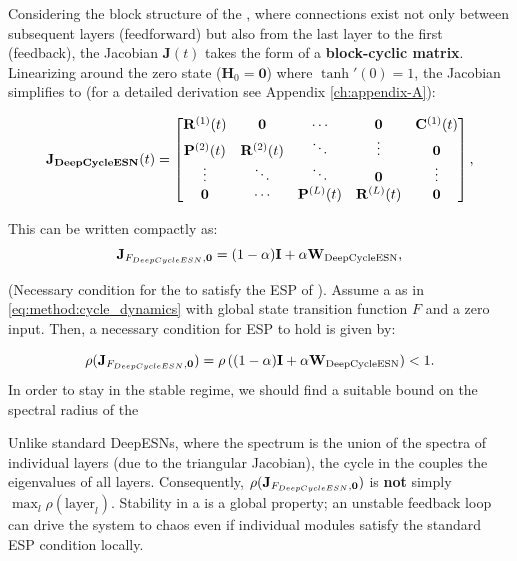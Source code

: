 Considering the block structure of the \DCR, where connections exist not only between subsequent layers
 (feedforward) but also from the last layer to the first (feedback), the Jacobian $\mathbf{J}(t)$ 
 takes the form of a \textbf{block-cyclic matrix}. Linearizing around the zero state ($\mathbf{H}_0 = \mathbf{0}$) where $\tanh'(0)=1$, the Jacobian simplifies to (for a detailed derivation see Appendix \ref{ch:appendix-A}):

\[
\mathbf{J_{DeepCycleESN}}(t) =
\begin{bmatrix}
\mathbf{R}^{(1)}(t) & \mathbf{0} & \cdots & \mathbf{0} & \mathbf{C}^{(1)}(t) \\
\mathbf{P}^{(2)}(t) & \mathbf{R}^{(2)}(t) & \ddots & \vdots & \mathbf{0} \\
\vdots & \ddots & \ddots & \mathbf{0} & \vdots \\
\mathbf{0} & \cdots & \mathbf{P}^{(L)}(t) & \mathbf{R}^{(L)}(t) & \mathbf{0}
\end{bmatrix},
\]

This can be written compactly as:
\begin{equation}
    \mathbf{J}_{F_{DeepCycleESN},\mathbf{0}} = (1-\alpha)\mathbf{I} + \alpha \mathbf{W}_{\text{DeepCycleESN}},
\end{equation}

\begin{theorem}
\label{thm:nec_esp_dcr}
(Necessary condition for the \DCR\@ to satisfy the ESP of \DCR\@). 
Assume a \DCR\@ as in \ref{eq:method:cycle_dynamics} with global state transition function $F$
 and a zero input. Then, a necessary condition for ESP to hold is given by:
\end{theorem} 
\begin{equation}
    \rho(\mathbf{J}_{F_{DeepCycleESN},\mathbf{0}}) = \rho\left( (1-\alpha)\mathbf{I} + \alpha \mathbf{W}_{\text{DeepCycleESN}} \right) < 1.
    \label{eq:method:nec_cond_dcr}
\end{equation}
In order to stay in the stable regime, we should find a suitable bound on the spectral radius of the 

\begin{remark}
Unlike standard DeepESNs, where the spectrum is the union of the spectra of individual layers
 (due to the triangular Jacobian), the cycle in the \DCR\@ couples the eigenvalues of all layers.
  Consequently, $\rho(\mathbf{J}_{F_{DeepCycleESN},\mathbf{0}})$ is \textbf{not} simply $\max_l \rho(\text{layer}_l)$.
   Stability in a \DCR\@ is a global property; an unstable feedback loop can drive the system to chaos even 
   if individual modules satisfy the standard ESP condition locally.
\end{remark}


